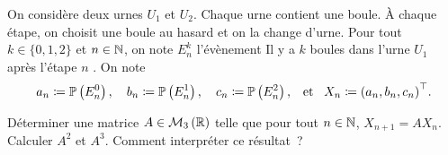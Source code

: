 \documentclass{magnolia}
\begin{document}
On considère deux urnes $U_1$ et $U_2$. Chaque urne contient une boule. À chaque étape, on choisit une boule au hasard et on la change d'urne. Pour tout $k \in \{0,1,2\}$ et
$n\in\mathbb{N}$, on note $E_n^k$ l'évènement \og Il y a $k$ boules dans l'urne $U_1$ après
l'étape $n$ \fg. On note
\[a_n \coloneqq \mathbb{P}\left(E_n^0\right),\quad b_n \coloneqq \mathbb{P}\left(E_n^1\right), \quad
  c_n \coloneqq \mathbb{P}\left(E_n^2\right), \quad\!\text{et}\quad\! 
  X_n \coloneqq {(a_n, b_n, c_n)}^{\top}.\]
\begin{questions}
\question Déterminer une matrice $A\in\mathcal{M}_{3}\left(\mathbb{R}\right)$ telle que pour tout $n\in\mathbb{N}$,
$X_{n+1}=A X_n$.
\question Calculer $A^2$ et $A^3$.
\question Comment interpréter ce résultat~?
\end{questions}
\end{document}
